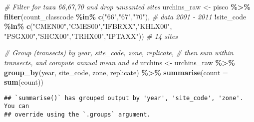 \documentclass[
]{article}
\newenvironment{Shaded}{\begin{snugshade}}{\end{snugshade}}
\newcommand{\AttributeTok}[1]{\textcolor[rgb]{0.13,0.29,0.53}{#1}}
\newcommand{\CommentTok}[1]{\textcolor[rgb]{0.56,0.35,0.01}{\textit{#1}}}
\newcommand{\FunctionTok}[1]{\textcolor[rgb]{0.13,0.29,0.53}{\textbf{#1}}}
\newcommand{\NormalTok}[1]{#1}
\newcommand{\OtherTok}[1]{\textcolor[rgb]{0.56,0.35,0.01}{#1}}
\newcommand{\SpecialCharTok}[1]{\textcolor[rgb]{0.81,0.36,0.00}{\textbf{#1}}}
\newcommand{\StringTok}[1]{\textcolor[rgb]{0.31,0.60,0.02}{#1}}
\begin{document}
\begin{Shaded}
\begin{Highlighting}[]
\CommentTok{\# Filter for taxa 66,67,70 and drop unwanted sites}
\NormalTok{urchins\_raw }\OtherTok{\textless{}{-}}\NormalTok{ pisco }\SpecialCharTok{\%\textgreater{}\%}
  \FunctionTok{filter}\NormalTok{(count\_classcode }\SpecialCharTok{\%in\%} \FunctionTok{c}\NormalTok{(}\StringTok{"66"}\NormalTok{,}\StringTok{"67"}\NormalTok{,}\StringTok{"70"}\NormalTok{), }\CommentTok{\# data 2001 {-} 2011}
         \SpecialCharTok{!}\NormalTok{site\_code }\SpecialCharTok{\%in\%} \FunctionTok{c}\NormalTok{(}\StringTok{"CMEN00"}\NormalTok{,}\StringTok{"CMES00"}\NormalTok{,}\StringTok{"IFBRXX"}\NormalTok{,}\StringTok{"KHLX00"}\NormalTok{,}
                           \StringTok{"PSGX00"}\NormalTok{,}\StringTok{"SHCX00"}\NormalTok{,}\StringTok{"TRHX00"}\NormalTok{,}\StringTok{"IPTAXX"}\NormalTok{)) }\CommentTok{\# 14 sites}

\CommentTok{\# Group (transects) by year, site\_code, zone, replicate, }
\CommentTok{\# then sum within transects, and compute annual mean and sd}
\NormalTok{urchins }\OtherTok{\textless{}{-}}\NormalTok{ urchins\_raw }\SpecialCharTok{\%\textgreater{}\%}
  \FunctionTok{group\_by}\NormalTok{(year, site\_code, zone, replicate) }\SpecialCharTok{\%\textgreater{}\%}
  \FunctionTok{summarise}\NormalTok{(}\AttributeTok{count =} \FunctionTok{sum}\NormalTok{(count))}
\end{Highlighting}
\end{Shaded}

\begin{verbatim}
## `summarise()` has grouped output by 'year', 'site_code', 'zone'. You can
## override using the `.groups` argument.
\end{verbatim}
\end{document}
